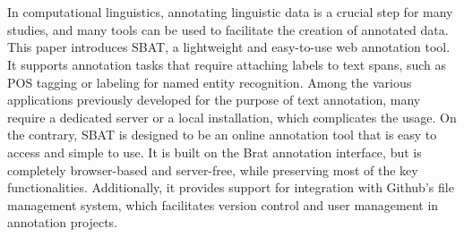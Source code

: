 \documentclass[12ptm a4paper]{article}
\begin{document}
\newpage

\newpage
\section*{}
In computational linguistics, annotating linguistic data is a crucial step for many studies, and many tools can be used to facilitate the creation of annotated data. This paper introduces SBAT, a lightweight and easy-to-use web annotation tool. It supports annotation tasks that require attaching labels to text spans, such as POS tagging or labeling for named entity recognition. Among the various applications previously developed for the purpose of text annotation, many require a dedicated server or a local installation, which complicates the usage. On the contrary, SBAT is designed to be an online annotation tool that is easy to access and simple to use. It is built on the Brat annotation interface, but is completely browser-based and server-free, while preserving most of the key functionalities. Additionally, it provides support for integration with Github's file management system, which facilitates version control and user management in annotation projects.
\newpage
\tableofcontents
\newpage
\listoffigures
\newpage
{}
\end{document}
